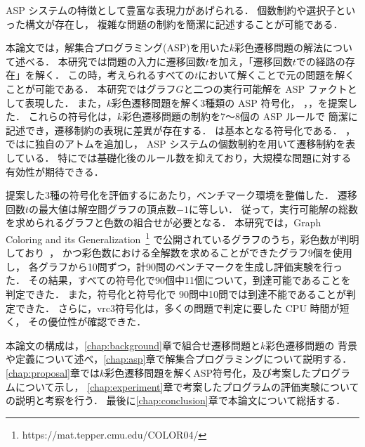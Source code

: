 ASP システムの特徴として豊富な表現力があげられる．
個数制約や選択子といった構文が存在し，
複雑な問題の制約を簡潔に記述することが可能である．

本論文では，解集合プログラミング(ASP)を用いた$k$彩色遷移問題の解法について述べる．
本研究では問題の入力に遷移回数$t$を加え，「遷移回数$t$での経路の存在」を解く．
この時，考えられるすべての$t$において解くことで元の問題を解くことが可能である．
本研究ではグラフ$G$と二つの実行可能解を ASP ファクトとして表現した．
また，$k$彩色遷移問題を解く3種類の ASP 符号化，
，，を提案した．
これらの符号化は，$k$彩色遷移問題の制約を7〜8個の ASP ルールで
簡潔に記述でき，遷移制約の表現に差異が存在する．
は基本となる符号化である．
，ではに独自のアトムを追加し，
ASP システムの個数制約を用いて遷移制約を表している．
特にでは基礎化後のルール数を抑えており，大規模な問題に対する有効性が期待できる．

提案した3種の符号化を評価するにあたり，ベンチマーク環境を整備した．
遷移回数$t$の最大値は解空間グラフの頂点数$-1$に等しい．
従って，実行可能解の総数を求められるグラフと色数の組合せが必要となる．
本研究では，Graph Coloring and its Generalization~\footnote{https://mat.tepper.cmu.edu/COLOR04/}
で公開されているグラフのうち，彩色数が判明しており~\cite{DBLP:journals/constraints/TamuraTKB09}，
かつ彩色数における全解数を求めることができたグラフ9個を使用し，
各グラフから10問ずつ，計90問のベンチマークを生成し評価実験を行った．
その結果，すべての符号化で90個中11個について，到達可能であることを判定できた．
また，符号化と符号化で
90問中10問では到達不能であることが判定できた．
さらに，\textsf{vrc3}符号化は，多くの問題で判定に要した CPU 時間が短く，
その優位性が確認できた．

本論文の構成は，\ref{chap:background}章で組合せ遷移問題と$k$彩色遷移問題の
背景や定義について述べ，\ref{chap:asp}章で解集合プログラミングについて説明する．
\ref{chap:proposal}章では$k$彩色遷移問題を解くASP符号化，及び考案したプログラムについて示し，
\ref{chap:experiment}章で考案したプログラムの評価実験についての説明と考察を行う．
最後に\ref{chap:conclusion}章で本論文について総括する．

